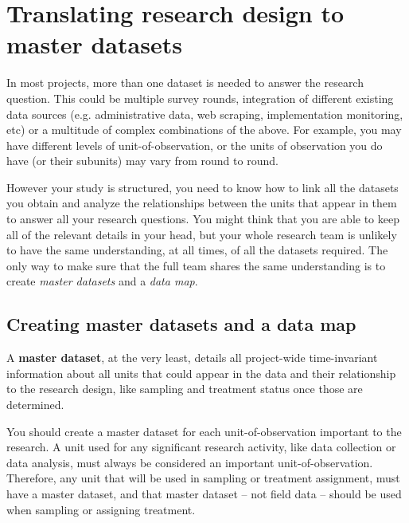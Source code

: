 
\section{Translating research design to master datasets}

In most projects, more than one dataset is needed to answer the research question.
This could be multiple survey rounds,
integration of different existing data sources (e.g. administrative data,
web scraping, implementation monitoring, etc)
or a multitude of complex combinations of the above.
For example, you may have different levels of unit-of-observation,
or the units of observation you do have (or their subunits)
may vary from round to round.

However your study is structured, you need to know how to link all the datasets you obtain
and analyze the relationships between the units that appear in them
to answer all your research questions.
You might think that you are able to keep all of the relevant details in your head,
but your whole research team is unlikely to have the same understanding,
at all times, of all the datasets required.
The only way to make sure that the full team shares the same understanding
is to create \textit{master datasets} and a \textit{data map}.


\subsection{Creating master datasets and a data map}

A \textbf{master dataset},
at the very least,
details all project-wide time-invariant information
about all units that could appear in the data
and their relationship to the research design,
like sampling and treatment status once those are determined.

You should create a master dataset
for each unit-of-observation
important to the research.
A unit used for any significant research activity,
like data collection or data analysis, 
must always be considered an important unit-of-observation.
Therefore, any unit
that will be used in sampling or treatment assignment,
must have a master dataset,
and that master dataset -- not field data --
should be used when sampling or assigning treatment.

